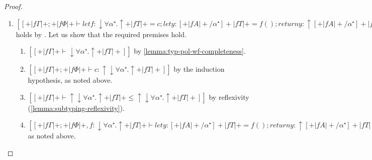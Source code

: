 \begin{proof}
\begin{caseof}
\begin{enumerate}
        \item $[[+|fΓ|+ ; +|fΦ|+  ⊢ let f : ↓∀α⁺.↑+|fT|+ = c; let y : [+|fA|+/α⁺]+|fT|+ = f(); return y : ↑[+|fA|+/α⁺]+|fT|+]]$
          holds by . Let us show that the
          required premises hold.
          \begin{enumerate}
            \item $[[+|fΓ|+ ⊢ ↓∀α⁺.↑+|fT|+]]$ by \cref{lemma:typ-pol-wf-completeness}.
            \item $[[+|fΓ|+ ; +|fΦ|+ ⊢ c : ↑↓∀α⁺.↑+|fT|+]]$ by the induction hypothesis, as noted above.
            \item $[[+|fΓ|+  ⊢ ↑↓∀α⁺.↑+|fT|+ ≤ ↑↓∀α⁺.↑+|fT|+]]$ by reflexivity (\cref{lemma:subtyping-reflexivity}).
            \item $[[+|fΓ|+ ; +|fΦ|+, f : ↓∀α⁺.↑+|fT|+  ⊢ let y : [+|fA|+/α⁺]+|fT|+ = f(); return y : ↑[+|fA|+/α⁺]+|fT|+]]$ as noted above.
          \end{enumerate}
      \end{enumerate}
  \end{caseof}
\end{proof}

